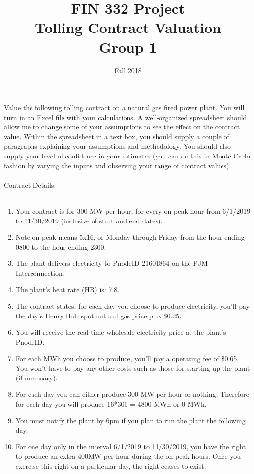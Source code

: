\documentclass{article}
\title{FIN 332 Project \\
Tolling Contract Valuation\\
\vspace{15pt}
\large{{\bf Group 1}}\\
\large{}}
\date{Fall 2018}
\begin{document}
\maketitle
\noindent Value the following tolling contract on a natural gas fired power plant.  You will turn in an Excel file with your calculations. A well-organized spreadsheet should allow me to change some of your assumptions to see the effect on the contract value.  Within the spreadsheet in a text box, you should supply a couple of paragraphs explaining your assumptions and methodology.  You should also supply your level of confidence in your estimates (you can do this in Monte Carlo fashion by varying the inputs and observing your range of contract values).\\
\\
Contract Details:\\
\\
\begin{enumerate}
\item Your contract is for 300 MW per hour, for every on-peak hour from 6/1/2019 to 11/30/2019 (inclusive of start and end dates).
\item Note on-peak means 5x16, or Monday through Friday from the hour ending 0800 to the hour ending 2300.  
\item The plant delivers electricity to PnodeID 21601864 on the PJM Interconnection.
\item The plant's heat rate (HR) is: 7.8.  
\item The contract states, for each day you choose to produce electricity, you'll pay the day's Henry Hub spot natural gas price plus \$0.25.   
\item You will receive the real-time wholesale electricity price at the plant's PnodeID.
\item For each MWh you choose to produce, you'll pay a operating fee of \$0.65.  You won't have to pay any other costs such as those for starting up the plant (if necessary).
\item For each day you can either produce 300 MW per hour or nothing.  Therefore for each day you will produce 16*300 = 4800 MWh or 0 MWh. 
\item You must notify the plant by 6pm if you plan to run the plant the following day. 
\item For one day only in the interval 6/1/2019 to 11/30/2019, you have the right to produce an extra 400MW per hour during the on-peak hours. Once you exercise this right on a particular day, the right ceases to exist.
\end{enumerate} 
\end{document}
